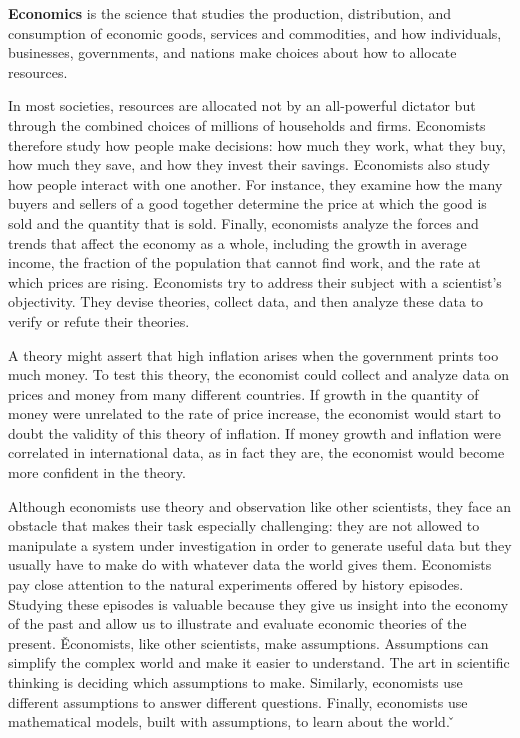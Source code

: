 \bd[Economics]
\textbf{Economics} is the science that studies the production, distribution, and consumption of economic goods,
services and commodities, and how individuals, businesses, governments, and nations make choices about how to
allocate resources.
\ed

In most societies, resources are allocated not by an all-powerful dictator but through the combined choices of
millions of households and firms. Economists therefore study how people make decisions: how much they work, what they
buy, how much they save, and how they invest their savings. Economists also study how people interact with one
another. For instance, they examine how the many buyers and sellers of a good together determine the price at which
the good is sold and the quantity that is sold. Finally, economists analyze the forces and trends that affect the
economy as a whole, including the growth in average income, the fraction of the population that cannot find work, and
the rate at which prices are rising. Economists try to address their subject with a scientist's objectivity. They
devise theories, collect data, and then analyze these data to verify or refute their theories.

\be
A theory might assert that high inflation arises when the government prints too much money. To test this theory, the
economist could collect and analyze data on prices and money from many different countries. If growth in the quantity
of money were unrelated to the rate of price increase, the economist would start to doubt the validity of this theory
of inflation. If money growth and inflation were correlated in international data, as in fact they are, the economist
would become more confident in the theory.
\ee

Although economists use theory and observation like other scientists, they face an obstacle that makes their task
especially challenging: they are not allowed to manipulate a system under investigation in order to generate useful
data but they usually have to make do with whatever data the world gives them. Economists pay close attention to the
natural experiments offered by history episodes. Studying these episodes is valuable because they give us insight
into the economy of the past and allow us to illustrate and evaluate economic theories of the present. \v

Economists, like other scientists, make assumptions. Assumptions can simplify the complex world and make it easier to
understand. The art in scientific thinking is deciding which assumptions to make. Similarly, economists use different
assumptions to answer different questions. Finally, economists use mathematical models, built with assumptions, to
learn about the world. \v

